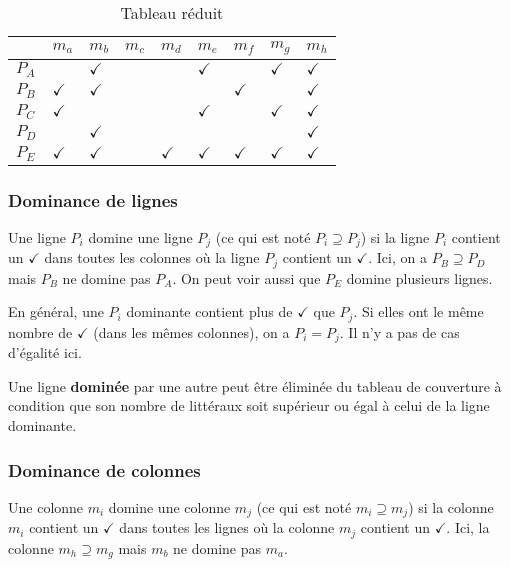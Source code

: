 \documentclass[11pt]{article}
\begin{document}
\begin{table}[htbp]
\caption{\label{tab:orgce60d61}Tableau réduit}
\centering
\begin{tabular}{lllllllll}
 & \(m_a\) & \(m_b\) & \(m_c\) & \(m_d\) & \(m_e\) & \(m_f\) & \(m_g\) & \(m_h\)\\[0pt]
\hline
\(P_A\) &  & \(\checkmark\) &  &  & \(\checkmark\) &  & \(\checkmark\) & \(\checkmark\)\\[0pt]
\(P_B\) & \(\checkmark\) & \(\checkmark\) &  &  &  & \(\checkmark\) &  & \(\checkmark\)\\[0pt]
\(P_C\) & \(\checkmark\) &  &  &  & \(\checkmark\) &  & \(\checkmark\) & \(\checkmark\)\\[0pt]
\(P_D\) &  & \(\checkmark\) &  &  &  &  &  & \(\checkmark\)\\[0pt]
\(P_E\) & \(\checkmark\) & \(\checkmark\) &  & \(\checkmark\) & \(\checkmark\) & \(\checkmark\) & \(\checkmark\) & \(\checkmark\)\\[0pt]
\end{tabular}
\end{table}


\subsubsection{Dominance de lignes}
\label{sec:org44487db}

Une ligne \(P_i\) domine une ligne \(P_j\) (ce qui est noté \(P_i \supseteq
P_j\)) si la ligne \(P_i\) contient un \(\checkmark\) dans toutes les colonnes où
la ligne \(P_j\) contient un \(\checkmark\). Ici, on a \(P_B \supseteq P_D\) mais
\(P_B\) ne domine pas \(P_A\). On peut voir aussi que \(P_E\) domine
plusieurs lignes.

En général, une \(P_i\) dominante contient plus de \(\checkmark\) que \(P_j\). Si
elles ont le même nombre de \(\checkmark\) (dans les mêmes colonnes), on a \(P_i =
P_j\). Il n'y a pas de cas d'égalité ici.

Une ligne \textbf{dominée} par une autre peut être éliminée du tableau de
couverture à condition que son nombre de littéraux soit supérieur ou
égal à celui de la ligne dominante.

\subsubsection{Dominance de colonnes}
\label{sec:org625311b}

Une colonne \(m_i\) domine une colonne \(m_j\) (ce qui est noté \(m_i \supseteq
m_j\)) si la colonne \(m_i\) contient un \(\checkmark\) dans toutes les lignes où
la colonne \(m_j\) contient un \(\checkmark\). Ici, la colonne \(m_h \supseteq
m_g\) mais \(m_b\) ne domine pas \(m_a\). 
\end{document}
